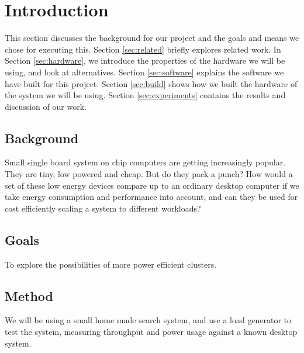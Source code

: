 \clearpage

\section{Introduction}
\label{sec:introduction}
This section discusses the background for our project and the goals and means we chose for executing this. 
Section \ref{sec:related} briefly explores related work. 
In Section \ref{sec:hardware}, we introduce the properties of the hardware we will be using, and look at alternatives.
Section \ref{sec:software} explains the software we have built for this project.
Section \ref{sec:build} shows how we built the hardware of the system we will be using.
Section \ref{sec:experiments} contains the results and discussion of our work.

\subsection{Background}
Small single board system on chip computers are getting increasingly popular. They are tiny, low powered and cheap. But do they pack a punch?
How would a set of these low energy devices compare up to an ordinary desktop computer if we take energy consumption and performance into account, and can they be used for cost efficiently scaling a system to different workloads?

\subsection{Goals}
To explore the possibilities of more power efficient clusters.

\subsection{Method}
We will be using a small home made search system, and use a load generator to test the system, measuring throughput and power usage against a known desktop system.

